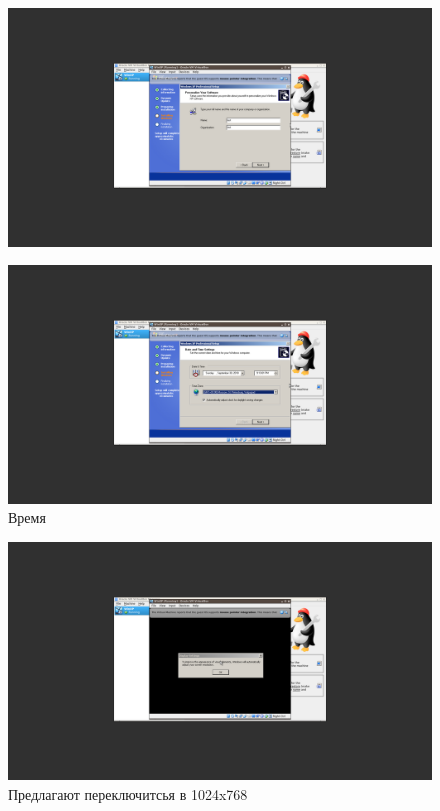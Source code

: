 \documentclass[a4paper]{article}
\begin{document}
\begin{figure}[H]
    \centering
    \includegraphics[width=\linewidth]{18.png}
\end{figure}    

\begin{figure}[H]
    \centering
    \includegraphics[width=\linewidth]{19.png}
    \caption{Время}
\end{figure}

\begin{figure}[H]
    \centering
    \includegraphics[width=\linewidth]{20.png}
    \caption{Предлагают переключитсья в 1024x768}
\end{figure}    
\end{document}
